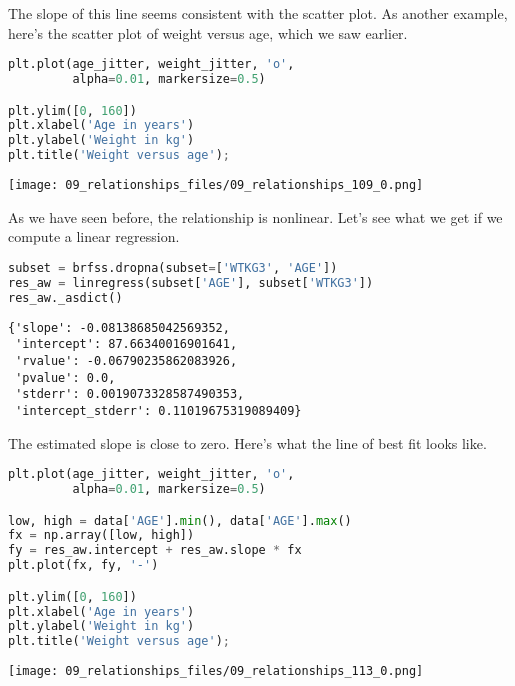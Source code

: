 The slope of this line seems consistent with the scatter plot. As
another example, here's the scatter plot of weight versus age, which we
saw earlier.

\begin{lstlisting}[language=Python,style=source]
plt.plot(age_jitter, weight_jitter, 'o', 
         alpha=0.01, markersize=0.5)

plt.ylim([0, 160])
plt.xlabel('Age in years')
plt.ylabel('Weight in kg')
plt.title('Weight versus age');
\end{lstlisting}

\begin{center}
\texttt{[image: 09\_relationships\_files/09\_relationships\_109\_0.png]}
\end{center}

As we have seen before, the relationship is nonlinear. Let's see what we
get if we compute a linear regression.

\begin{lstlisting}[language=Python,style=source]
subset = brfss.dropna(subset=['WTKG3', 'AGE']) 
res_aw = linregress(subset['AGE'], subset['WTKG3'])
res_aw._asdict()
\end{lstlisting}

\begin{lstlisting}[style=output]
{'slope': -0.08138685042569352,
 'intercept': 87.66340016901641,
 'rvalue': -0.06790235862083926,
 'pvalue': 0.0,
 'stderr': 0.0019073328587490353,
 'intercept_stderr': 0.11019675319089409}
\end{lstlisting}

The estimated slope is close to zero. Here's what the line of best fit
looks like.

\begin{lstlisting}[language=Python,style=source]
plt.plot(age_jitter, weight_jitter, 'o', 
         alpha=0.01, markersize=0.5)

low, high = data['AGE'].min(), data['AGE'].max()
fx = np.array([low, high])
fy = res_aw.intercept + res_aw.slope * fx
plt.plot(fx, fy, '-')

plt.ylim([0, 160])
plt.xlabel('Age in years')
plt.ylabel('Weight in kg')
plt.title('Weight versus age');
\end{lstlisting}

\begin{center}
\texttt{[image: 09\_relationships\_files/09\_relationships\_113\_0.png]}
\end{center}

